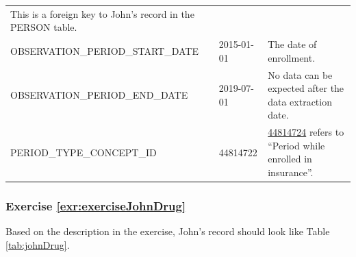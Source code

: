 \documentclass[11pt]{book}
\theoremstyle{definition}
\theoremstyle{definition}
\theoremstyle{definition}
\theoremstyle{remark}
\begin{document}
\begin{longtable}[]{@{}lll@{}}
\begin{minipage}[t]{0.49\columnwidth}
This is a foreign key to John's record in the PERSON table.\strut
\end{minipage}\tabularnewline
\begin{minipage}[t]{0.28\columnwidth}\raggedright
OBSERVATION\_PERIOD\_START\_DATE\strut
\end{minipage} & \begin{minipage}[t]{0.15\columnwidth}\raggedright
2015-01-01\strut
\end{minipage} & \begin{minipage}[t]{0.49\columnwidth}\raggedright
The date of enrollment.\strut
\end{minipage}\tabularnewline
\begin{minipage}[t]{0.28\columnwidth}\raggedright
OBSERVATION\_PERIOD\_END\_DATE\strut
\end{minipage} & \begin{minipage}[t]{0.15\columnwidth}\raggedright
2019-07-01\strut
\end{minipage} & \begin{minipage}[t]{0.49\columnwidth}\raggedright
No data can be expected after the data extraction date.\strut
\end{minipage}\tabularnewline
\begin{minipage}[t]{0.28\columnwidth}\raggedright
PERIOD\_TYPE\_CONCEPT\_ID\strut
\end{minipage} & \begin{minipage}[t]{0.15\columnwidth}\raggedright
44814722\strut
\end{minipage} & \begin{minipage}[t]{0.49\columnwidth}\raggedright
\href{http://athena.ohdsi.org/search-terms/terms/44814722}{44814724} refers to ``Period while enrolled in insurance''.\strut
\end{minipage}\tabularnewline
\bottomrule
\end{longtable}

\hypertarget{exercise-refexrexercisejohndrug}{%
\subsubsection*{Exercise \ref{exr:exerciseJohnDrug}}\label{exercise-refexrexercisejohndrug}}

Based on the description in the exercise, John's record should look like Table \ref{tab:johnDrug}.
\end{document}
